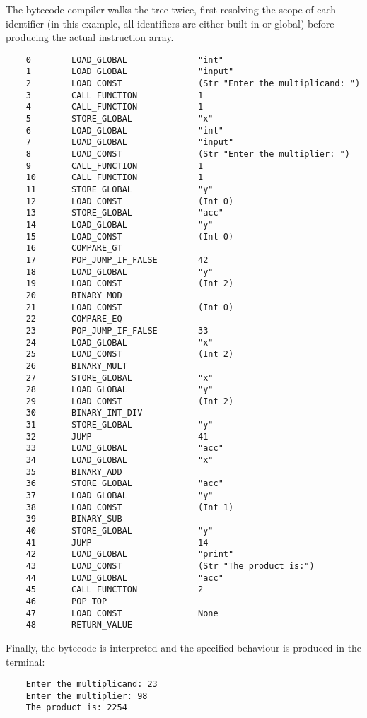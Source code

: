 \documentclass[11pt, twoside]{article}
\begin{document}
    The bytecode compiler walks the tree twice, first resolving the scope of each identifier (in this example, all identifiers are either built-in or global) before producing the actual instruction array.
    \begin{lstlisting}
    0        LOAD_GLOBAL              "int"
    1        LOAD_GLOBAL              "input"
    2        LOAD_CONST               (Str "Enter the multiplicand: ")
    3        CALL_FUNCTION            1
    4        CALL_FUNCTION            1
    5        STORE_GLOBAL             "x"
    6        LOAD_GLOBAL              "int"
    7        LOAD_GLOBAL              "input"
    8        LOAD_CONST               (Str "Enter the multiplier: ")
    9        CALL_FUNCTION            1
    10       CALL_FUNCTION            1
    11       STORE_GLOBAL             "y"
    12       LOAD_CONST               (Int 0)
    13       STORE_GLOBAL             "acc"
    14       LOAD_GLOBAL              "y"
    15       LOAD_CONST               (Int 0)
    16       COMPARE_GT
    17       POP_JUMP_IF_FALSE        42
    18       LOAD_GLOBAL              "y"
    19       LOAD_CONST               (Int 2)
    20       BINARY_MOD
    21       LOAD_CONST               (Int 0)
    22       COMPARE_EQ
    23       POP_JUMP_IF_FALSE        33
    24       LOAD_GLOBAL              "x"
    25       LOAD_CONST               (Int 2)
    26       BINARY_MULT
    27       STORE_GLOBAL             "x"
    28       LOAD_GLOBAL              "y"
    29       LOAD_CONST               (Int 2)
    30       BINARY_INT_DIV
    31       STORE_GLOBAL             "y"
    32       JUMP                     41
    33       LOAD_GLOBAL              "acc"
    34       LOAD_GLOBAL              "x"
    35       BINARY_ADD
    36       STORE_GLOBAL             "acc"
    37       LOAD_GLOBAL              "y"
    38       LOAD_CONST               (Int 1)
    39       BINARY_SUB
    40       STORE_GLOBAL             "y"
    41       JUMP                     14
    42       LOAD_GLOBAL              "print"
    43       LOAD_CONST               (Str "The product is:")
    44       LOAD_GLOBAL              "acc"
    45       CALL_FUNCTION            2
    46       POP_TOP
    47       LOAD_CONST               None
    48       RETURN_VALUE
    \end{lstlisting}
    Finally, the bytecode is interpreted and the specified behaviour is produced in the terminal:
    \begin{lstlisting}
    Enter the multiplicand: 23
    Enter the multiplier: 98
    The product is: 2254
    \end{lstlisting}
    
\end{document}

